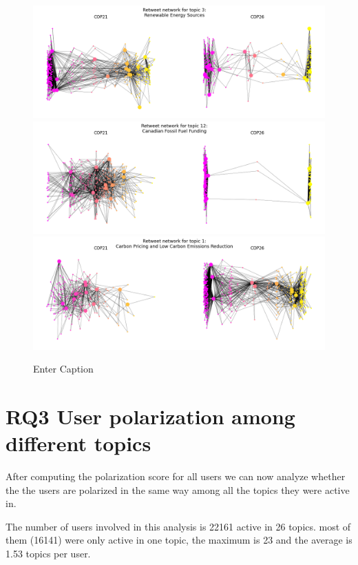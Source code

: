 \begin{figure}[H]
    \centering
    \includegraphics[width=0.95\linewidth]{Chapter5//figures/21vs26_t3.png}
    \includegraphics[width=0.95\linewidth]{Chapter5//figures/21vs26_t12.png}
    \includegraphics[width=0.95\linewidth]{Chapter5//figures/21vs26_t1.png}
    \caption{Enter Caption}
    \label{fig:cop2x_network_comparison}
\end{figure}

\section{RQ3 User polarization among different topics}
After computing the polarization score for all users we can now analyze whether the the users are polarized in the same way among all the topics they were active in.

The number of users involved in this analysis is 22161 active in 26 topics. most of them (16141) were only active in one topic, the maximum is 23 and the average is 1.53 topics per user. 

